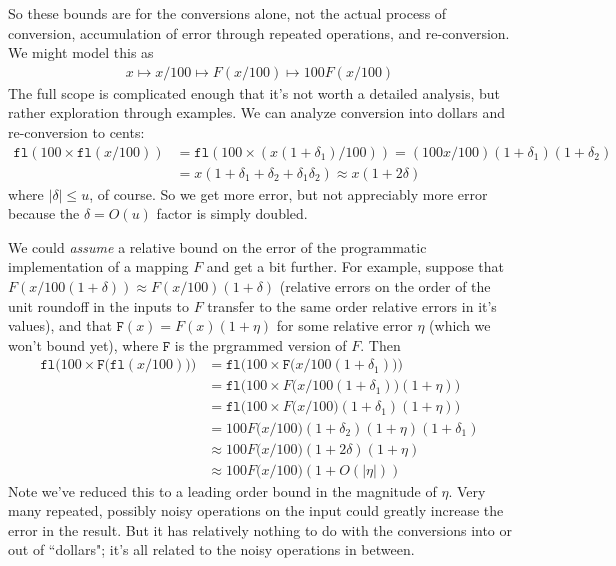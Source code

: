 \documentclass[11pt, oneside]{amsart}   	%
\begin{document}
So these bounds are for the conversions alone, not the actual process of conversion, accumulation of error through repeated operations, and re-conversion. We might model this as 
\begin{align*}
    x \mapsto x/100 \mapsto F(x/100) \mapsto 100 F(x/100)
\end{align*}
The full scope is complicated enough that it's not worth a detailed analysis, but rather exploration through examples. We can analyze conversion into dollars and re-conversion to cents: 
\begin{align*}
    \texttt{fl}(100\times\texttt{fl}(x/100))
        &= \texttt{fl}(100 \times (x(1+\delta_1)/100))
        = (100x/100) (1+\delta_1)(1+\delta_2) \\
        &= x(1+\delta_1+\delta_2+\delta_1\delta_2)
        \approx x(1+2\delta)
\end{align*}
where $|\delta| \leq u$, of course. So we get more error, but not appreciably more error because the $\delta = O(u)$ factor is simply doubled. 

We could {\em assume} a relative bound on the error of the programmatic implementation of a mapping $F$ and get a bit further. For example, suppose that $F(x/100(1+\delta)) \approx F(x/100)(1+\delta)$ (relative errors on the order of the unit roundoff in the inputs to $F$ transfer to the same order relative errors in it's values), and that $\texttt{F}(x) = F(x)(1+\eta)$ for some relative error $\eta$ (which we won't bound yet), where $\texttt{F}$ is the prgrammed version of $F$. Then
\begin{align*}
    \texttt{fl}\Big(100 \times \texttt{F}\big(\texttt{fl}(x/100)\big)\Big)
        &= \texttt{fl}\Big( 100 \times \texttt{F}\big(x/100(1+\delta_1)\big)\Big) \\
        &= \texttt{fl}\Big( 100 \times F\big(x/100(1+\delta_1)\big)(1+\eta) \Big) \\
        &= \texttt{fl}\Big( 100 \times F\big(x/100\big)(1+\delta_1)(1+\eta) \Big) \\
        &= 100 F\big(x/100\big)(1+\delta_2)(1+\eta)(1+\delta_1) \\
        &\approx 100 F\big(x/100\big)(1+2\delta)(1+\eta) \\
        &\approx 100 F\big(x/100\big)(1+O(|\eta|))
\end{align*}
Note we've reduced this to a leading order bound in the magnitude of $\eta$. Very many repeated, possibly noisy operations on the input could greatly increase the error in the result. But it has relatively nothing to do with the conversions into or out of ``dollars"; it's all related to the noisy operations in between. 
\end{document}
